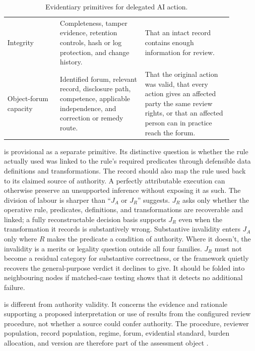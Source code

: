 \begin{table}[tbp]
\begin{tabular}{>{\raggedright\arraybackslash}p{0.21\linewidth}%
                >{\raggedright\arraybackslash}p{0.34\linewidth}%
                >{\raggedright\arraybackslash}p{0.35\linewidth}}
Integrity & Completeness, tamper evidence, retention controls, hash or log protection, and change history. & That an intact record contains enough information for review. \\
Object-forum capacity & Identified forum, relevant record, disclosure path, competence, applicable independence, and correction or remedy route. & That the original action was valid, that every action gives an affected party the same review rights, or that an affected person can in practice reach the forum. \\
\bottomrule
\end{tabular}
\caption{Evidentiary primitives for delegated AI action.}
\label{tab:evidentiary-primitives}
\end{table}

 is provisional as a separate primitive. Its distinctive question is whether the rule actually used was linked to the rule's required predicates through defensible data definitions and transformations. The record should also map the rule used back to its claimed source of authority. A perfectly attributable execution can otherwise preserve an unsupported inference without exposing it as such. The division of labour is sharper than \enquote{\(J_A\) or \(J_R\)} suggests. \(J_R\) asks only whether the operative rule, predicates, definitions, and transformations are recoverable and linked; a fully reconstructable decision basis supports \(J_R\) even when the transformation it records is substantively wrong. Substantive invalidity enters \(J_A\) only where \(R\) makes the predicate a condition of authority. Where it doesn't, the invalidity is a merits or legality question outside all four families. \(J_R\) must not become a residual category for substantive correctness, or the framework quietly recovers the general-purpose verdict it declines to give. It should be folded into neighbouring nodes if matched-case testing shows that it detects no additional failure.

 is different from authority validity. It concerns the evidence and rationale supporting a proposed interpretation or use of results from the configured review procedure, not whether a source could confer authority. The procedure, reviewer population, record population, regime, forum, evidential standard, burden allocation, and version are therefore part of the assessment object \citep{messick1995Validity}.

